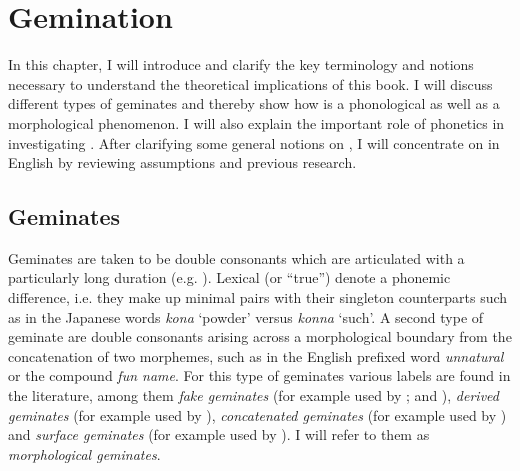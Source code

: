 \chapter{Gemination} \label{Gemination}


In this chapter, I will introduce and clarify the key terminology and notions necessary to understand the theoretical implications of this book. I will discuss different types of {geminates} and thereby show how  is a phonological as well as a morphological phenomenon. I will also explain the important role of phonetics in investigating . After clarifying some general notions on , I will concentrate on  in English by reviewing assumptions and previous research. 

\section{Geminates} \label{what is gemination}

Geminates are taken to be double consonants which are articulated with a particularly long duration (e.g. \citealt{Hartmann.1972, Catford.1988, Trask.1996, Matthews.1997, Crystal.2008,Davis.2011, Galea.2016}). Lexical (or ``true'')  denote a phonemic difference, i.e. they make up minimal pairs with their singleton counterparts such as in the Japanese words  \textit{kona} ‘powder’ versus \textit{konna} ‘such'. A second type of {geminate} are double consonants arising across a morphological boundary from the concatenation of two morphemes, such as in the English prefixed word \textit{unnatural} or the compound \textit{fun name}. For this type of {geminates} various labels are found in the literature, among them \textit{fake  {geminates} }(for example used by \citealt{Hayes.1986b}; \citealt{Oh.2012} and \citealt{Kotzor.2016}), \textit{derived geminates} (for example used by \citealt{Kubozono.2017b}), \textit{concatenated {geminates}} (for example used by \citealt{Ridouane.2010}) and \textit{surface {geminates}} (for example used by \citealt{Lahiri.1988, Galea.2016}). I will refer to them as \textit{morphological {geminates}}.


